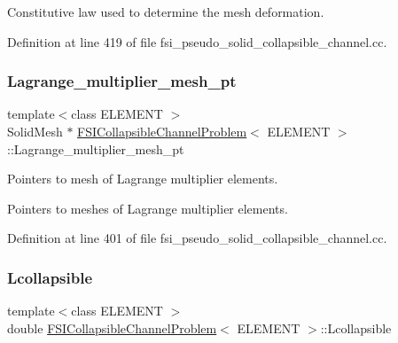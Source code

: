 Constitutive law used to determine the mesh deformation. 



Definition at line 419 of file fsi\+\_\+pseudo\+\_\+solid\+\_\+collapsible\+\_\+channel.\+cc.

\mbox{\label{classFSICollapsibleChannelProblem_a3a5aa5a00fbecec4bede0aee9af6b338}} 
\subsubsection{\texorpdfstring{Lagrange\+\_\+multiplier\+\_\+mesh\+\_\+pt}{Lagrange\_multiplier\_mesh\_pt}}
{\footnotesize\ttfamily template$<$class E\+L\+E\+M\+E\+NT $>$ \\
Solid\+Mesh $\ast$ \hyperlink{classFSICollapsibleChannelProblem}{F\+S\+I\+Collapsible\+Channel\+Problem}$<$ E\+L\+E\+M\+E\+NT $>$\+::Lagrange\+\_\+multiplier\+\_\+mesh\+\_\+pt\hspace{0.3cm}{\ttfamily [private]}}



Pointers to mesh of Lagrange multiplier elements. 

Pointers to meshes of Lagrange multiplier elements. 

Definition at line 401 of file fsi\+\_\+pseudo\+\_\+solid\+\_\+collapsible\+\_\+channel.\+cc.

\mbox{\label{classFSICollapsibleChannelProblem_ae6ce3834d06f0fb75db945a782ff0108}} 
\subsubsection{\texorpdfstring{Lcollapsible}{Lcollapsible}}
{\footnotesize\ttfamily template$<$class E\+L\+E\+M\+E\+NT $>$ \\
double \hyperlink{classFSICollapsibleChannelProblem}{F\+S\+I\+Collapsible\+Channel\+Problem}$<$ E\+L\+E\+M\+E\+NT $>$\+::Lcollapsible\hspace{0.3cm}{\ttfamily [private]}}



